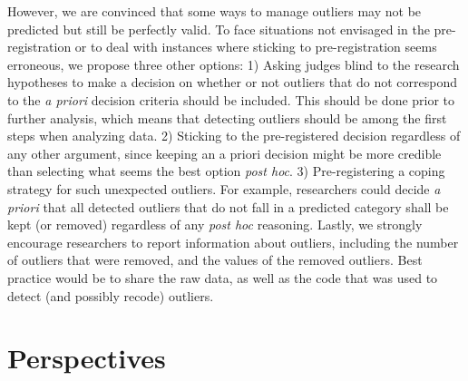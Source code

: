 \documentclass[man,floatsintext]{apa6}
\begin{document}
However, we are convinced that some ways to manage outliers may not be predicted but still be perfectly valid. To face situations not envisaged in the pre-registration or to deal with instances where sticking to pre-registration seems erroneous, we propose three other options:
1) Asking judges blind to the research hypotheses to make a decision on whether or not outliers that do not correspond to the \emph{a priori} decision criteria should be included. This should be done prior to further analysis, which means that detecting outliers should be among the first steps when analyzing data.
2) Sticking to the pre-registered decision regardless of any other argument, since keeping an a priori decision might be more credible than selecting what seems the best option \emph{post hoc}.
3) Pre-registering a coping strategy for such unexpected outliers. For example, researchers could decide \emph{a priori} that all detected outliers that do not fall in a predicted category shall be kept (or removed) regardless of any \emph{post hoc} reasoning.
Lastly, we strongly encourage researchers to report information about outliers, including the number of outliers that were removed, and the values of the removed outliers. Best practice would be to share the raw data, as well as the code that was used to detect (and possibly recode) outliers.

\hypertarget{perspectives}{%
\section{Perspectives}\label{perspectives}}
\end{document}

